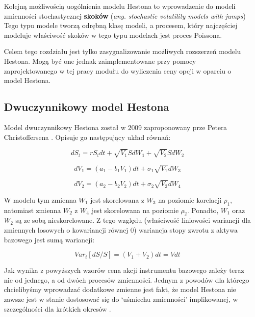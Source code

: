 \documentclass{pracamgr}
\begin{document}
Kolejną możliwością uogólnienia modelu Hestona to wprowadzenie do modeli zmienności stochastycznej
\textbf{skoków} (\textit{ang. stochastic volatility models with jumps})
Tego typu modele tworzą odrębną klasę modeli, a procesem, który najczęściej modeluje właściwość
skoków w tego typu modelach jest proces Poissona.

Celem tego rozdziału jest tylko zasygnalizowanie możliwych rozszerzeń modelu Hestona.
Mogą być one jednak zaimplementowane przy pomocy zaprojektowanego w tej pracy modułu 
do wyliczenia ceny opcji w oparciu o model Hestona. 

\subsection{Dwuczynnikowy model Hestona} %
\label{sec:modelDwuczynnikowy}
Model dwuczynnikowy Hestona został w 2009 zaproponowany prze
Petera Christoffersena  \cite{Christoffersen}.
Opisuje go następujący układ równań:

\begin{equation}
dS_t  = r S_t dt + \sqrt{V_1} S dW_1 + \sqrt{V_2} S dW_2
\end{equation} 

\begin{equation}
dV_1  = (a_1 - b_1 V_1)dt + \sigma_1 \sqrt{V_1} dW_3 
\end{equation}

\begin{equation}
dV_2  = (a_2 - b_2 V_2)dt + \sigma_2 \sqrt{V_2} dW_4 
\end{equation}

W modelu tym zmienna $W_1$ jest skorelowana z $W_3$ na poziomie korelacji $\rho_1$, natomiast
zmienna $W_2$ z $W_4$ jest skorelowana na poziomie $\rho_2$. Ponadto, $W_1$ oraz $W_2$ są ze sobą 
nieskorelowane. Z tego względu (właściwość
liniowości wariancji dla zmiennych losowych o kowariancji równej $0$) wariancja stopy zwrotu z aktywa
bazowego jest sumą wariancji:

\begin{equation}
  Var_t[dS/S] = (V_1 + V_2)dt = Vdt
\end{equation}

Jak wynika z powyższych wzorów cena akcji instrumentu bazowego zależy teraz nie od jednego, a od 
dwóch procesów zmienności.
Jednym z powodów dla którego chcielibyśmy wprowadzać dodatkowe zmienne jest fakt, że model
Hestona nie zawsze jest w stanie dostosować się do `uśmiechu zmienności'  implikowanej, w 
szczególności dla krótkich okresów  \cite{HestonExtensions}.
\end{document}

